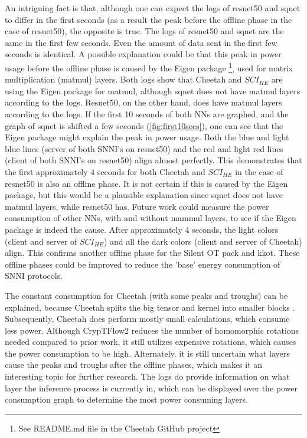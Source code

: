 \documentclass[../thesis.tex]{subfiles}
\begin{document}
An intriguing fact is that, although one can expect the logs of resnet50 and sqnet to differ in the first seconds (as a result the peak before the offline phase in the case of resnet50), the opposite is true. The logs of resnet50 and sqnet are the same in the first few seconds. Even the amount of data sent in the first few seconds is identical. A possible explanation could be that this peak in power usage before the offline phase is caused by the Eigen package \footnote{See README.md file in the Cheetah GitHub project}, used for matrix multiplication (matmul) layers. Both logs show that Cheetah and $SCI_{HE}$ are using the Eigen package for matmul, although sqnet does not have matmul layers according to the logs. Resnet50, on the other hand, does have matmul layers according to the logs. If the first 10 seconds of both NNs are graphed, and the graph of sqnet is shifted a few seconds (\autoref{fig:first10secs}), one can see that the Eigen package might explain the peak in power usage. Both the blue and light blue lines (server of both SNNI's on resnet50) and the red and light red lines (client of both SNNI's on resnet50) align almost perfectly. This demonstrates that the first approximately 4 seconds for both Cheetah and $SCI_{HE}$ in the case of resnet50 is also an offline phase. It is not certain if this is caused by the Eigen package, but this would be a plausible explanation since sqnet does not have matmul layers, while resnet50 has. Future work could measure the power consumption of other NNs, with and without mammul layers, to see if the Eigen package is indeed the cause. After approximately 4 seconds, the light colors (client and server of $SCI_{HE}$) and all the dark colors (client and server of Cheetah) align. This confirms another offline phase for the Silent OT pack and kkot. These offline phases could be improved to reduce the 'base' energy consumption of SNNI protocols. 

The constant consumption for Cheetah (with some peaks and troughs) can be explained, because Cheetah splits the big tensor and kernel into smaller blocks \parencite[p. 8]{cheetah}. Subsequently, Cheetah does perform mostly small calculations, which consume less power. Although CrypTFlow2 reduces the number of homomorphic rotations needed compared to prior work, it still utilizes expensive rotations, which causes the power consumption to be high. Alternately, it is still uncertain what layers cause the peaks and troughs after the offline phases, which makes it an interesting topic for further research. The logs do provide information on what layer the inference process is currently in, which can be displayed over the power consumption graph to determine the most power consuming layers.
\end{document}
